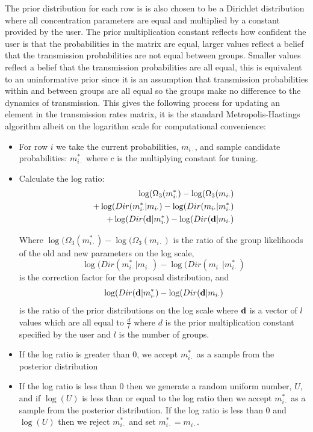 \documentclass[11pt,a4paper]{report}
\begin{document}
The prior distribution for each row is is also chosen to be a Dirichlet distribution where all concentration parameters are equal and multiplied by a constant provided by the user. The prior multiplication constant reflects how confident the user is that the probabilities in the matrix are equal, larger values reflect a belief that the transmission probabilities are not equal between groups. Smaller values reflect a belief that the transmission probabilities are all equal, this is equivalent to an uninformative prior since it is an assumption that transmission probabilities within and between groups are all equal so the groups make no difference to the dynamics of transmission. This gives the following process for updating an element in the transmission rates matrix, it is the standard Metropolis-Hastings algorithm albeit on the logarithm scale for computational convenience:
\begin{itemize}
\item For row $i$ we take the current probabilities, $m_{i \cdot}$, and sample candidate probabilities: $m_{i \cdot}^{*}$ where $c$ is the multiplying constant for tuning.
\item Calculate the log ratio: 
\begin{equation}
\begin{split}
\log(\Omega_3(m_{i \cdot}^{*}) - \log(\Omega_3(m_{i \cdot}) \\ +  \log(Dir(m_{i \cdot}^{*}|m_{i \cdot}) - \log(Dir(m_{i \cdot}|m_{i \cdot}^{*}) \\ + \log(Dir({\bf d}|m_{i \cdot}^{*}) - \log(Dir({\bf d}|m_{i \cdot})
\end{split}
\end{equation}

Where $\log(\Omega_3(m_{i \cdot}^{*}) - \log(\Omega_3(m_{i \cdot})$ is the ratio of the group likelihoods of the old and new parameters on the log scale,
 \[ \log(Dir(m_{i \cdot}^{*}|m_{i \cdot}) - \log(Dir(m_{i \cdot}|m_{i \cdot}^{*}) \]
is the correction factor for the proposal distribution, and
\[\log(Dir({\bf d}|m_{i \cdot}^{*}) - \log(Dir({\bf d}|m_{i \cdot})\]
is the ratio of the prior distributions on the log scale where ${\bf d}$ is a vector of $l$ values which are all equal to $\frac{d}{l}$ where $d$ is the prior multiplication constant specified by the user and $l$ is the number of groups.
\item If  the log ratio is greater than 0, we accept $m_{i \cdot}^{*}$ as a sample from the posterior distribution
\item If the log ratio is less than 0 then we generate a random uniform number, $U$, and if $\log(U)$ is less than or equal to the log ratio then we accept $m_{i \cdot}^{*}$ as a sample from the posterior distribution. If the log ratio is less than 0 and $\log(U)$ then we reject $m_{i \cdot}^{*}$ and set $m_{i \cdot}^{*}= m_{i \cdot}$.
\end{itemize}
\end{document}

